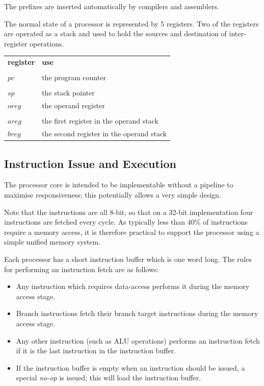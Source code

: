 \documentclass[a4paper, 12pt]{article}
\begin{document}
The prefixes are inserted automatically by compilers
and assemblers. 

The normal state of a processor is represented by 5 registers.
Two of the registers are operated as a stack and used to hold the
sources and destination of inter-register operations. 

\begin{tabular}{ll}
{\bf register} & {\bf use}\\
&\\
$pc$ & the program counter\\
&\\
$sp$ & the stack pointer\\
$oreg$ & the operand register\\
&\\
$areg$ & the first register in the operand stack \\
$breg$ & the second register in the operand stack
\end{tabular}

\subsection*{Instruction Issue and Execution}

The processor core is intended to be implementable without
a pipeline to maximise responsiveness; this potentially allows
a very simple design. 

Note that the instructions are all 8-bit, so that on a 
32-bit implementation four instructions are fetched every cycle.
As typically less than 40\% of instructions require a memory
access, it is therefore practical to support the processor
using a simple unified memory system.

Each processor has a short instruction buffer which is one 
word long. The rules for performing an instruction 
fetch are as follows:

\begin{itemize}
\item Any instruction which requires data-access performs
it during the memory access stage.
\item Branch instructions fetch their branch target instructions
during the memory access stage. 
\item Any other instruction (such as ALU operations) 
performs an instruction fetch if it is the
last instruction in the instruction buffer. 
 \item If the instruction buffer is empty when an instruction 
should be issued, a special {\it no-op} is issued; this 
will load the instruction buffer. 
\end{itemize}
\end{document}
